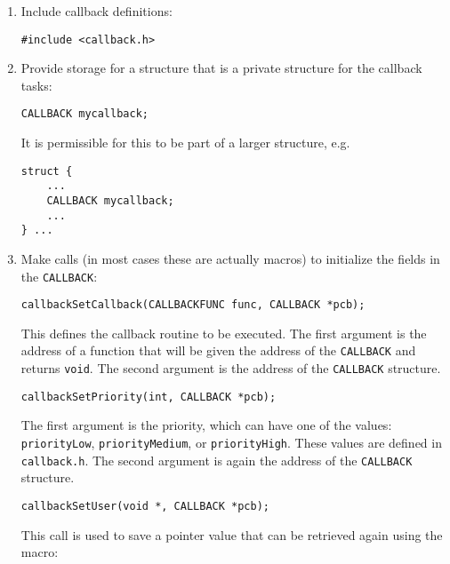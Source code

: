 \begin{enumerate}

\item Include callback definitions:

\begin{verbatim}
#include <callback.h>
\end{verbatim}

\item Provide storage for a structure that is a private structure for the callback tasks:

\begin{verbatim}
CALLBACK mycallback;
\end{verbatim}

It is permissible for this to be part of a larger structure, e.g.

\begin{verbatim}
struct {
    ...
    CALLBACK mycallback;
    ...
} ...
\end{verbatim}

\item Make calls (in most cases these are actually macros) to initialize the fields in the \verb|CALLBACK|:

\begin{verbatim}
callbackSetCallback(CALLBACKFUNC func, CALLBACK *pcb);
\end{verbatim}

This defines the callback routine to be executed. The first argument is the address of a function that will be given the address of the \verb|CALLBACK| and returns \verb|void|. The second argument is the address of the \verb|CALLBACK| structure.

\begin{verbatim}
callbackSetPriority(int, CALLBACK *pcb);
\end{verbatim}

The first argument is the priority, which can have one of the values: \verb|priorityLow|, \verb|priorityMedium|, or 
\verb|priorityHigh|. These values are defined in \verb|callback.h|. The second argument is again the address of the 
\verb|CALLBACK| structure.

\begin{verbatim}
callbackSetUser(void *, CALLBACK *pcb);
\end{verbatim}

This call is used to save a pointer value that can be retrieved again using the macro:


\end{enumerate}
